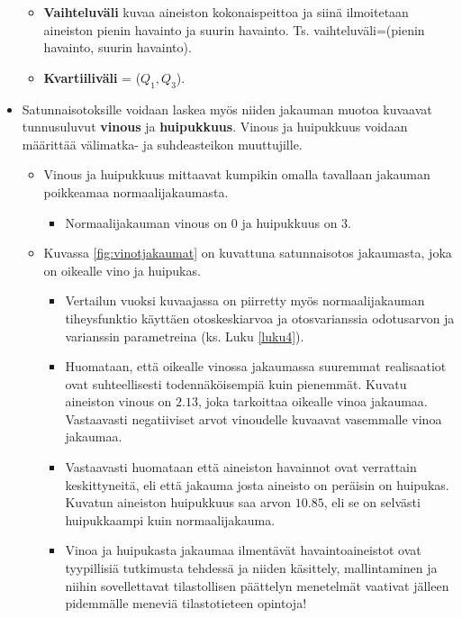 \documentclass[
]{book}
\providecommand{\tightlist}{%
  \setlength{\itemsep}{0pt}\setlength{\parskip}{0pt}}
\begin{document}
\begin{itemize}
  \begin{itemize}
  \tightlist
  \item
    \textbf{Vaihteluväli} kuvaa aineiston kokonaispeittoa ja siinä ilmoitetaan aineiston pienin havainto ja suurin havainto. Ts. vaihteluväli=(pienin havainto, suurin havainto).
  \item
    \textbf{Kvartiiliväli} = (\(Q_1, Q_3\)).
  \end{itemize}
\item
  Satunnaisotoksille voidaan laskea myös niiden jakauman muotoa kuvaavat tunnusuluvut \textbf{vinous} ja \textbf{huipukkuus}. Vinous ja huipukkuus voidaan määrittää välimatka- ja suhdeasteikon muuttujille.

  \begin{itemize}
  \tightlist
  \item
    Vinous ja huipukkuus mittaavat kumpikin omalla tavallaan jakauman poikkeamaa normaalijakaumasta.

    \begin{itemize}
    \tightlist
    \item
      Normaalijakauman vinous on 0 ja huipukkuus on 3.
    \end{itemize}
  \item
    Kuvassa \ref{fig:vinotjakaumat} on kuvattuna satunnaisotos jakaumasta, joka on oikealle vino ja huipukas.

    \begin{itemize}
    \tightlist
    \item
      Vertailun vuoksi kuvaajassa on piirretty myös normaalijakauman tiheysfunktio käyttäen otoskeskiarvoa ja otosvarianssia odotusarvon ja varianssin parametreina (ks. Luku \ref{luku4}).\\
    \item
      Huomataan, että oikealle vinossa jakaumassa suuremmat realisaatiot ovat suhteellisesti todennäköisempiä kuin pienemmät. Kuvatu aineiston vinous on \(2.13\), joka tarkoittaa oikealle vinoa jakaumaa. Vastaavasti negatiiviset arvot vinoudelle kuvaavat vasemmalle vinoa jakaumaa.
    \item
      Vastaavasti huomataan että aineiston havainnot ovat verrattain keskittyneitä, eli että jakauma josta aineisto on peräisin on huipukas. Kuvatun aineiston huipukkuus saa arvon \(10.85\), eli se on selvästi huipukkaampi kuin normaalijakauma.
    \item
      Vinoa ja huipukasta jakaumaa ilmentävät havaintoaineistot ovat tyypillisiä tutkimusta tehdessä ja niiden käsittely, mallintaminen ja niihin sovellettavat tilastollisen päättelyn menetelmät vaativat jälleen pidemmälle meneviä tilastotieteen opintoja!
    \end{itemize}
  \end{itemize}
\end{itemize}
\end{document}
